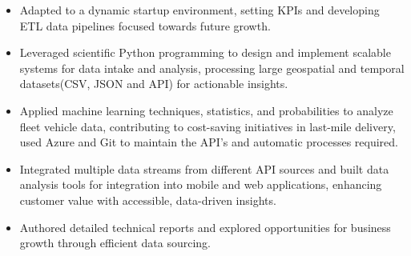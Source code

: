 \documentclass[10pt,a4paper,ragged2e,withhyper]{altacv}
\begin{document}

\begin{paracol}{2}


\begin{itemize}
    \item Adapted to a dynamic startup environment, setting KPIs and developing ETL data pipelines focused towards future growth.
    \item Leveraged scientific Python programming to design and implement scalable systems for data intake and analysis, processing large geospatial and temporal datasets(CSV, JSON and API) for actionable insights.
    \item Applied machine learning techniques, statistics, and probabilities to analyze fleet vehicle data, contributing to cost-saving initiatives in last-mile delivery, used Azure and Git to maintain the API's and automatic processes required.
    \item Integrated multiple data streams from different API sources and built data analysis tools for integration into mobile and web applications, enhancing customer value with accessible, data-driven insights.
    \item Authored detailed technical reports and explored opportunities for business growth through efficient data sourcing.
\end{itemize}


\end{paracol}
\end{document}
